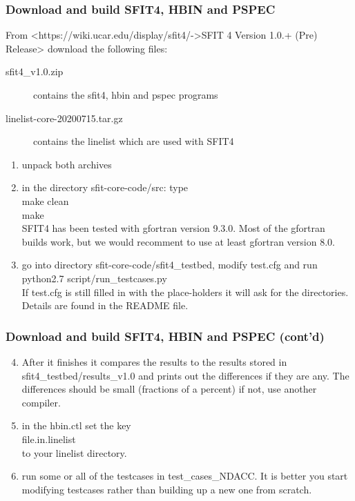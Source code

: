 \documentclass[notes=hide]{beamer}
\begin{document}
\begin{frame}
  \frametitle{Download and build SFIT4, HBIN and PSPEC}
  From <https://wiki.ucar.edu/display/sfit4/->SFIT 4 Version 1.0.+
  (Pre) Release> download the following files:
  \begin{description}
  \item [sfit4\_v1.0.zip] contains the sfit4, hbin and pspec programs
  \item[linelist-core-20200715.tar.gz]  contains the linelist which
    are used with SFIT4
  \end{description}
  \begin{enumerate}
  \item unpack both archives
  \item in the directory sfit-core-code/src: type\\
    make clean\\
    make\\
    SFIT4 has been tested with gfortran version 9.3.0. Most of the
    gfortran builds work, but we would recomment to use at least
    gfortran version 8.0.
  \item go into directory sfit-core-code/sfit4\_testbed, modify
    test.cfg and run\\
    python2.7 script/run\_testcases.py\\
    If test.cfg is still filled in with the place-holders it will ask
    for the directories. Details are found in the README file.
  \end{enumerate}
\end{frame}

\begin{frame}
  \frametitle{Download and build SFIT4, HBIN and PSPEC (cont'd)}
  \begin{enumerate}
    \setcounter{enumi}{3}
  \item After it finishes it compares the results to the results
    stored in sfit4\_testbed/results\_v1.0 and prints out the differences
    if they are any. The differences should be small (fractions of a
    percent) if not, use another compiler.
  \item in the hbin.ctl set the key\\
    file.in.linelist\\
    to your linelist directory.
  \item run some or all of the testcases in test\_cases\_NDACC. It is
    better you start modifying testcases rather than building up a new
    one from scratch.
  \end{enumerate}
\end{frame}
\end{document}
